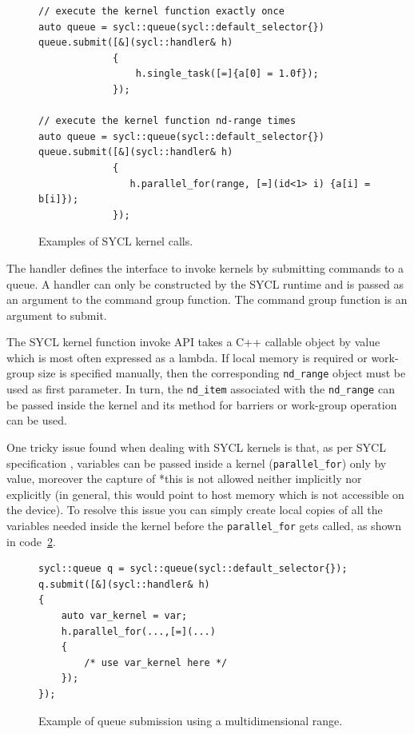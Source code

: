 \begin{figure}[ht!]
\renewcommand{\figurename}{Code}
\begin{verbatim}
// execute the kernel function exactly once
auto queue = sycl::queue(sycl::default_selector{})
queue.submit([&](sycl::handler& h)
             {
                 h.single_task([=]{a[0] = 1.0f});
             });
             
// execute the kernel function nd-range times
auto queue = sycl::queue(sycl::default_selector{})
queue.submit([&](sycl::handler& h)
             {
                h.parallel_for(range, [=](id<1> i) {a[i] = b[i]}); 
             });
\end{verbatim}
\caption{Examples of SYCL kernel calls.}
\label{code:kernel_execution}
\end{figure}

The handler defines the interface to invoke kernels by submitting commands to a queue.
A handler can only be constructed by the SYCL runtime and is passed as an argument to the command group function. The command group function is an argument to submit.

The SYCL kernel function invoke API takes a C++ callable object by value which is most often expressed as a lambda. If local memory is required or work-group size is specified manually, then the corresponding \Verb "nd_range" object must be used as first parameter. In turn, the \Verb "nd_item" associated with the \Verb "nd_range" can be passed inside the kernel and its method for barriers or work-group operation can be used.


One tricky issue found when dealing with SYCL kernels is that, as per SYCL specification \cite{sycl_specification}, variables can be passed inside a kernel (\Verb "parallel_for") only by value, moreover the capture of *this is not allowed neither implicitly nor explicitly (in general, this would point to host memory which is not accessible on the device). To resolve this issue you can simply create local copies of all the variables needed inside the kernel before the \Verb "parallel_for" gets called, as shown in code~\ref{code:kernel_variables}.

\begin{figure}[ht!]
\renewcommand{\figurename}{Code}
\begin{verbatim}
sycl::queue q = sycl::queue(sycl::default_selector{});
q.submit([&](sycl::handler& h)
{
    auto var_kernel = var;
    h.parallel_for(...,[=](...)
    {
        /* use var_kernel here */               
    });
});
\end{verbatim}
\caption{Example of queue submission using a multidimensional range.}
\label{code:kernel_variables}
\end{figure}


